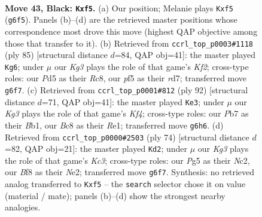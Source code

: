 \documentclass[11pt]{article}
\begin{document}
\clearpage

\begin{figure}[p]\centering
\begin{subfigure}{0.46\textwidth}\centering
\resizebox{\linewidth}{!}{%
\newchessgame
\chessboard[
  setfen={1nb2b2/1p6/1n4k1/pN1p1Pp1/7p/PP2P2P/4PK2/2BB4 b - - 0 43},
  showmover=false,
  pgfstyle=straightmove, color=movearrow, markmove={g6-f5}
]}
\caption{}
\end{subfigure}\hfill
\begin{subfigure}{0.46\textwidth}\centering
\resizebox{\linewidth}{!}{%
\newchessgame
\chessboard[
  setfen={2r5/3R1k2/p3pP2/1p4pn/1P2Nb2/PK6/1B5P/8 b - - 1 43},
  showmover=false,
  pgfstyle=straightmove, color=movearrow, markmove={f7-g6}
]}
\caption{}
\end{subfigure}
\\[4pt]
\begin{subfigure}{0.46\textwidth}\centering
\resizebox{\linewidth}{!}{%
\newchessgame
\chessboard[
  setfen={4b3/2k5/2p2rpp/ppn5/5K1P/1PN2P2/P5P1/1B2R3 w - - 7 47},
  showmover=false,
  pgfstyle=straightmove, color=movearrow, markmove={f4-e3}
]}
\caption{}
\end{subfigure}\hfill
\begin{subfigure}{0.46\textwidth}\centering
\resizebox{\linewidth}{!}{%
\newchessgame
\chessboard[
  setfen={8/5pbp/1k2b3/pp3p2/1Pp5/P1K3P1/2N1N1B1/8 w - - 6 38},
  showmover=false,
  pgfstyle=straightmove, color=movearrow, markmove={c3-d2}
]}
\caption{}
\end{subfigure}
\caption{\textbf{Move 43, Black: \texttt{Kxf5}.} (a) Our position; Melanie plays \texttt{Kxf5} (\texttt{g6f5}). Panels (b)--(d) are the retrieved master positions whose correspondence most drove this move (highest QAP objective among those that transfer to it). (b) Retrieved from \texttt{ccrl\_top\_p0003\#1118} (ply 85) [structural distance $d$=84, QAP obj=41]: the master played \texttt{Kg6}; under $\mu$ our \emph{Kg3} plays the role of that game's \emph{Kf2}; cross-type roles: our \emph{P}d5 as their \emph{R}c8, our \emph{p}f5 as their \emph{r}d7; transferred move \texttt{g6f7}. (c) Retrieved from \texttt{ccrl\_top\_p0001\#812} (ply 92) [structural distance $d$=71, QAP obj=41]: the master played \texttt{Ke3}; under $\mu$ our \emph{Kg3} plays the role of that game's \emph{Kf4}; cross-type roles: our \emph{P}b7 as their \emph{B}b1, our \emph{B}c8 as their \emph{R}e1; transferred move \texttt{g6h6}. (d) Retrieved from \texttt{ccrl\_top\_p0000\#2503} (ply 74) [structural distance $d$=82, QAP obj=21]: the master played \texttt{Kd2}; under $\mu$ our \emph{Kg3} plays the role of that game's \emph{Kc3}; cross-type roles: our \emph{P}g5 as their \emph{N}c2, our \emph{B}f8 as their \emph{N}e2; transferred move \texttt{g6f7}. Synthesis: no retrieved analog transferred to \texttt{Kxf5} -- the \texttt{search} selector chose it on value (material / mate); panels (b)--(d) show the strongest nearby analogies.}
\label{fig:thought-m85}
\end{figure}
\end{document}
